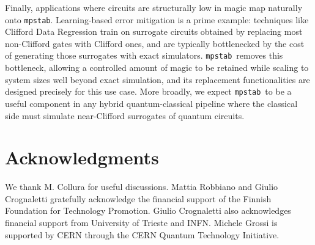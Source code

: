 \documentclass[pra,aps,twocolumn,longbibliography,preprintnumbers,superscriptaddress,nofootnotebib,10pt]{revtex4-2}
\newcommand{\mpstab}{\texttt{mpstab}}
\begin{document}
Finally, applications where circuits are structurally low in magic map 
naturally onto \mpstab. Learning-based error mitigation is a prime 
example: techniques like Clifford Data Regression train on surrogate 
circuits obtained by replacing most non-Clifford gates with Clifford 
ones, and are typically bottlenecked by the cost of generating those 
surrogates with exact simulators. \mpstab\ removes this bottleneck, 
allowing a controlled amount of magic to be retained while scaling to 
system sizes well beyond exact simulation, and its replacement 
functionalities are designed precisely for this use case. More broadly, 
we expect \mpstab\ to be a useful component in any hybrid 
quantum-classical pipeline where the classical side must simulate 
near-Clifford surrogates of quantum circuits. 

\section{Acknowledgments}
We thank M. Collura for useful discussions.
Mattia Robbiano and Giulio Crognaletti gratefully acknowledge the financial support of the Finnish Foundation for Technology Promotion. Giulio Crognaletti also acknowledges financial support from University of Trieste and INFN.
Michele Grossi is supported by CERN through the CERN Quantum Technology Initiative.


\end{document}
